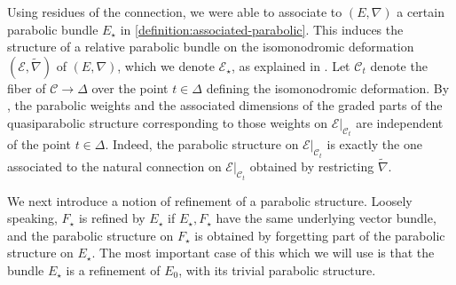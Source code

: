 \begin{remark}
\notready
	\label{remark:parabolic-structure-on-isomonodromic-deformation}
	Using residues of the connection, we were able to associate to $(E,
	\nabla)$ a certain parabolic bundle $E_\star$ in
	\autoref{definition:associated-parabolic}.
	This induces the structure of a relative parabolic bundle on the
	isomonodromic deformation $(\mathscr E, \widetilde{\nabla})$ of $(E,
	\nabla)$, which we denote $\mathscr E_\star$, as explained in
	\cite[\S4.3]{BHH:parabolic}.
	Let $\mathscr C_t$ denote the fiber of $\mathscr C \to \Delta$
	over the point $t \in \Delta$ defining the isomonodromic deformation.
	By \cite[Lemma 4.2]{BHH:parabolic}, the parabolic weights and the
	associated dimensions of the graded parts of the quasiparabolic
	structure corresponding to those weights on $\mathscr E|_{\mathscr C_t}$ are independent
	of the point $t \in \Delta$. Indeed, the parabolic structure on $\mathscr{E}|_{\mathscr{C}_t}$ is exactly the one associated to the natural connection on $\mathscr{E}|_{\mathscr{C}_t}$ obtained by restricting $\widetilde{\nabla}$.
\end{remark}
We next introduce a notion of refinement of a parabolic structure. Loosely speaking, $F_\star$ is refined by $E_\star$ if $E_\star, F_\star$ have the same underlying vector bundle, and the parabolic structure on $F_\star$ is obtained by forgetting part of the parabolic structure on $E_\star$. The most
important case of this which we will use is that the bundle $E_\star$ is a refinement of $E_0$, with its trivial parabolic structure.

